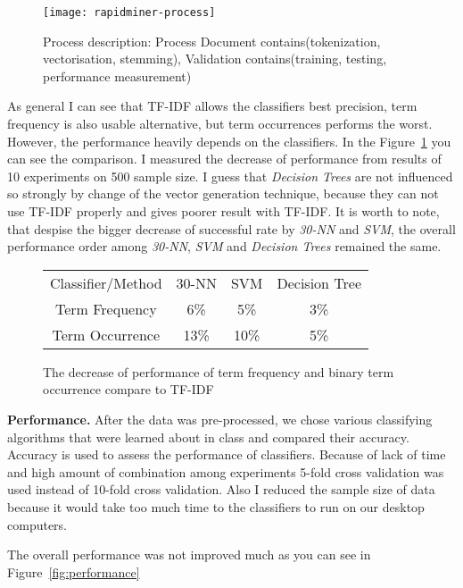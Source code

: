 \begin{figure}
\begin{center} 
\texttt{[image: rapidminer-process]}
\caption{Process description: Process Document contains(tokenization, vectorisation, stemming), Validation contains(training, testing, performance measurement)}
\end{center}
\end{figure}
As general I can see that TF-IDF allows the classifiers best precision, term frequency is also usable alternative, but term occurrences performs the worst.
However, the performance heavily depends on the classifiers.
In the Figure~\ref{fig:vectors} you can see the comparison. 
I measured the decrease of performance from results of 10 experiments on 500 sample size.
I guess that {\it Decision Trees} are not influenced so strongly by change of the vector generation
technique, because they can not use TF-IDF properly and gives poorer result with TF-IDF.
It is worth to note, that despise the bigger decrease of successful rate by {\it 30-NN} and {\it SVM},
the overall performance order among {\it 30-NN}, {\it SVM} and {\it Decision Trees} remained the same.
\begin{figure}
\begin{center}
\begin{tabular}{|c|c|c|c|}
\hline
Classifier/Method     & 30-NN  & SVM &  Decision Tree   \\
Term Frequency        & 6\%    & 5\% &    3\%  \\
Term Occurrence       & 13\%   & 10\% &   5\%  \\
\hline
\end{tabular}
\caption{\label{fig:vectors} The decrease of performance of term frequency and binary term occurrence compare to TF-IDF}
\end{center}
\end{figure}

{\bf Performance.} After the data was pre-processed, we chose various classifying algorithms that were learned about in class and compared their accuracy. Accuracy is used to assess the performance of classifiers. Because of lack of time and high amount of combination among experiments 5-fold cross validation was used instead of 10-fold cross validation. Also I reduced the sample size of data because it would take too much time to the classifiers to run on our desktop computers.

The overall performance was not improved much as you can see in Figure~\ref{fig:performance}

